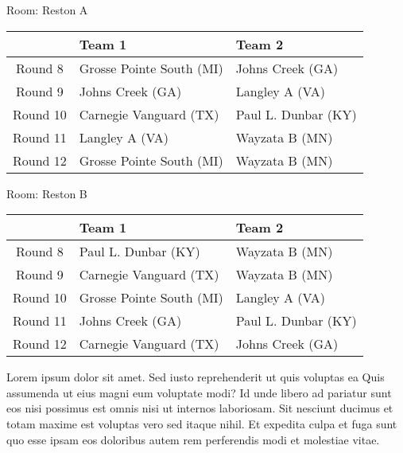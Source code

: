 \documentclass{article}%
\begin{document}
\vspace*{8pt}%
\linebreak%
\begin{flushleft}%
\begin{Large}%
Room: Reston A%
\end{Large}%
\end{flushleft}%
\begin{tabularx}{\textwidth}{|c|Y|Y|}%
\hline%
&Team 1&Team 2\\%
\hline%
Round 8&Grosse Pointe South (MI)&Johns Creek (GA)\\%
Round 9&Johns Creek (GA)&Langley A (VA)\\%
Round 10&Carnegie Vanguard (TX)&Paul L. Dunbar (KY)\\%
Round 11&Langley A (VA)&Wayzata B (MN)\\%
Round 12&Grosse Pointe South (MI)&Wayzata B (MN)\\%
\hline%
\end{tabularx}%
\vspace*{8pt}%
\linebreak%
\begin{flushleft}%
\begin{Large}%
Room: Reston B%
\end{Large}%
\end{flushleft}%
\begin{tabularx}{\textwidth}{|c|Y|Y|}%
\hline%
&Team 1&Team 2\\%
\hline%
Round 8&Paul L. Dunbar (KY)&Wayzata B (MN)\\%
Round 9&Carnegie Vanguard (TX)&Wayzata B (MN)\\%
Round 10&Grosse Pointe South (MI)&Langley A (VA)\\%
Round 11&Johns Creek (GA)&Paul L. Dunbar (KY)\\%
Round 12&Carnegie Vanguard (TX)&Johns Creek (GA)\\%
\hline%
\end{tabularx}%
\vspace*{8pt}%
\linebreak%
\newline%
Lorem ipsum dolor sit amet. Sed iusto reprehenderit ut quis voluptas ea Quis assumenda ut eius magni eum voluptate modi? Id unde libero ad pariatur sunt eos nisi possimus est omnis nisi ut internos laboriosam. Sit nesciunt ducimus et totam maxime est voluptas vero sed itaque nihil. Et expedita culpa et fuga sunt quo esse ipsam eos doloribus autem rem perferendis modi et molestiae vitae.\newline%
\end{document}
